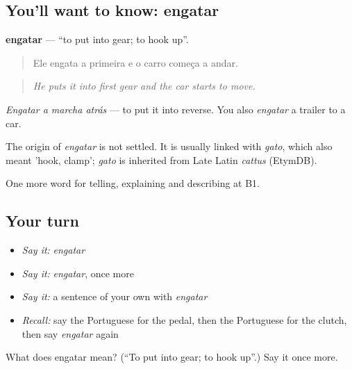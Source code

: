 \subsection*{You'll want to know: engatar}
\textbf{engatar} — \textquotedblleft{}to put into gear; to hook up\textquotedblright{}.

\begin{quote}
Ele engata a primeira e o carro começa a andar.
\end{quote}

\begin{quote}
\emph{He puts it into first gear and the car starts to move.}
\end{quote}

\emph{Engatar a marcha atrás} — to put it into reverse. You also \emph{engatar} a trailer to a car.

\begin{cousinweb}
The origin of \emph{engatar} is not settled. It is usually linked with \emph{gato}, which also meant 'hook, clamp'; \emph{gato} is inherited from Late Latin \emph{cattus} (EtymDB).
\end{cousinweb}

\begin{grammarlens}[title={What you've built}]
One more word for telling, explaining and describing at B1.
\end{grammarlens}

\subsection*{Your turn}
\begin{itemize}
\raggedright
  \item \emph{Say it:} \emph{engatar}
  \item \emph{Say it:} \emph{engatar}, once more
  \item \emph{Say it:} a sentence of your own with \emph{engatar}
  \item \emph{Recall:} say the Portuguese for the pedal, then the Portuguese for the clutch, then say \emph{engatar} again
\end{itemize}

\begin{tcolorbox}[breakable,colback=teal!4,colframe=teal!35!black,title={Before you move on}]
What does engatar mean? (\textquotedblleft{}To put into gear; to hook up\textquotedblright{}.) Say it once more.
\end{tcolorbox}
